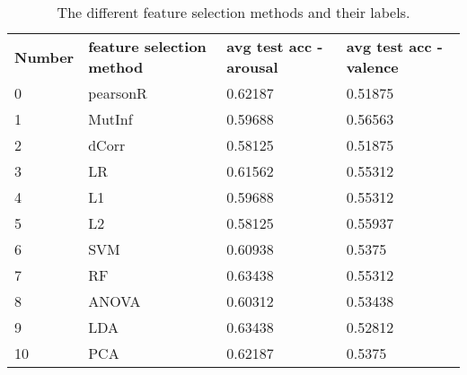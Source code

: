 \begin{table}[H]
\centering
\begin{tabular}{llll}
\textbf{Number} & \textbf{feature selection method} & \textbf{avg test acc - arousal} & \textbf{avg test acc - valence} \\
0               & pearsonR                          & 0.62187                             & 0.51875                             \\
1               & MutInf                            & 0.59688                             & 0.56563                             \\
2               & dCorr                             & 0.58125                             & 0.51875                             \\
3               & LR                                & 0.61562                             & 0.55312                             \\
4               & L1                                & 0.59688                             & 0.55312                             \\
5               & L2                                & 0.58125                             & 0.55937                             \\
6               & SVM                               & 0.60938                             & 0.5375                              \\
7               & RF                                & 0.63438                             & 0.55312                             \\
8               & ANOVA                             & 0.60312                             & 0.53438                             \\
9               & LDA                               & 0.63438                             & 0.52812                             \\
10              & PCA                               & 0.62187                             & 0.5375                             
\end{tabular}
\caption{The different feature selection methods and their labels\label{genacctable}.}
\end{table}


